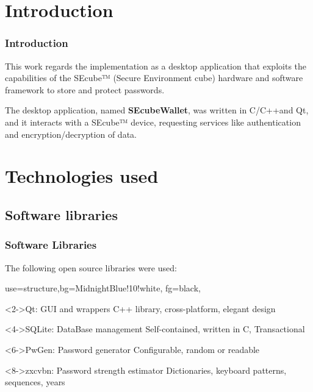 \documentclass[14pt,usenames,dvipsnames]{beamer}
\begin{document}
\section{Introduction}



\begin{frame}
\frametitle{Introduction}
This work regards the implementation as a desktop application that exploits the capabilities of the SEcube™ (Secure Environment cube) hardware and software framework to store and protect passwords.

\vspace{10pt}
The desktop application, named \textbf{SEcubeWallet}, was written in C/C++and Qt, and it interacts with a SEcube™ device, requesting services like authentication and encryption/decryption of data.
\end{frame}



\section{Technologies used}

\subsection{Software libraries}
\begin{frame}
\frametitle{Software Libraries}

The following open source libraries were used:
{
 {use=structure,bg=MidnightBlue!10!white, fg=black,}

\begin{block}<2->{Qt: GUI and wrappers}
 {C++ library, cross-platform, elegant design}
\end{block}

\begin{block}<4->{SQLite: DataBase management}
 {Self-contained, written in C, Transactional}
\end{block}

\begin{block}<6->{PwGen: Password generator}
 {Configurable, random or readable}
\end{block}

\begin{block}<8->{zxcvbn: Password strength estimator}
 {Dictionaries, keyboard patterns, sequences, years}
\end{block}
}
\end{frame}
\end{document}
